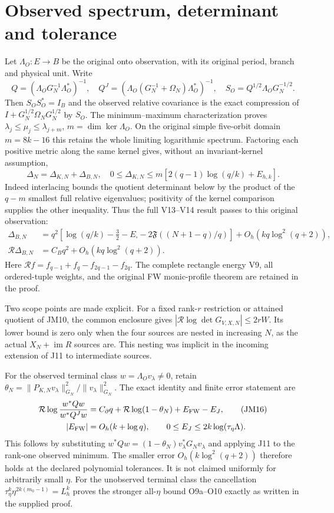 \documentclass[11pt]{article}
\begin{document}
\section{Observed spectrum, determinant and tolerance}
Let $\Lambda_O:E\to B$ be the original onto observation, with its
original period, branch and physical unit. Write
\[
 Q=(\Lambda_OG_N^{-1}\Lambda_O^*)^{-1},\quad
 Q^J=(\Lambda_O(G_N^{-1}+\Omega_N)\Lambda_O^*)^{-1},\quad
 S_O=Q^{1/2}\Lambda_OG_N^{-1/2}.\tag{JM12}
\]
Then $S_OS_O^*=I_B$ and the observed relative covariance is the exact
compression of $I+G_N^{1/2}\Omega_NG_N^{1/2}$ by $S_O$.
The minimum--maximum characterization proves
$\lambda_j\le\mu_j\le\lambda_{j+m}$, $m=\dim\ker\Lambda_O$.
On the original simple five-orbit domain $m=8k-16$ this retains the
whole limiting logarithmic spectrum. Factoring each positive metric
along the same kernel gives, without an invariant-kernel assumption,
\[
 \Delta_N=\Delta_{K,N}+\Delta_{B,N},\quad
 0\le\Delta_{K,N}\le m[2(q-1)\log(q/k)+E_{h,k}].\tag{JM13}
\]
Indeed interlacing bounds the quotient determinant below by the
product of the $q-m$ smallest full relative eigenvalues; positivity
of the kernel comparison supplies the other inequality.
Thus the full V13--V14 result passes to this original observation:
\begin{align}
 \Delta_{B,N}&=q^2\left[\log(q/k)-\tfrac32-E_\square
 -2\mathfrak F((N+1-q)/q)\right]+O_h(kq\log^2(q+2)),\tag{JM14}\\
 \mathcal R\Delta_{B,N}&=C_Bq^2+O_h(kq\log^2(q+2)).\tag{JM15}
\end{align}
Here $\mathcal R f=f_{q-1}+f_q-f_{2q-1}-f_{2q}$.
The complete rectangle energy V9, all ordered-tuple weights,
and the original FW monic-profile theorem are retained in the proof.

Two scope points are made explicit. For a fixed rank-$r$ restriction
or attained quotient of JM10, the common enclosure gives
$|\mathcal R\log\det G_{V,X,N}|\le2rW$. Its lower bound is zero only
when the four sources are nested in increasing $N$, as the actual
$X_N+\operatorname{im}R$ sources are. This nesting was implicit in
the incoming extension of J11 to intermediate sources.

For the observed terminal class $w=\Lambda_Ov_\lambda\ne0$, retain
$\theta_N=\|P_{K,N}v_\lambda\|_{G_N}^2/\|v_\lambda\|_{G_N}^2$.
The exact identity and finite error statement are
\begin{align}
 \mathcal R\log\frac{w^*Qw}{w^*Q^Jw}
 &=C_\partial q+\mathcal R\log(1-\theta_N)
   +E_{\rm FW}-E_J,\tag{JM16}\\
 |E_{\rm FW}|&=O_h(k+\log q),\qquad
 0\le E_J\le2k\log(\tau_\eta\Lambda).\notag
\end{align}
This follows by substituting
$w^*Qw=(1-\theta_N)v_\lambda^*G_Nv_\lambda$ and applying J11 to
the rank-one observed minimum. The smaller error
$O_h(k\log^2(q+2))$ therefore holds at the declared polynomial
tolerances. It is not claimed uniformly for arbitrarily small $\eta$.
For the unobserved terminal class the cancellation
$\tau_\eta^k\eta^{2k(m_0-1)}=L_h^k$ proves the stronger
all-$\eta$ bound O9a--O10 exactly as written in the supplied proof.
\end{document}
